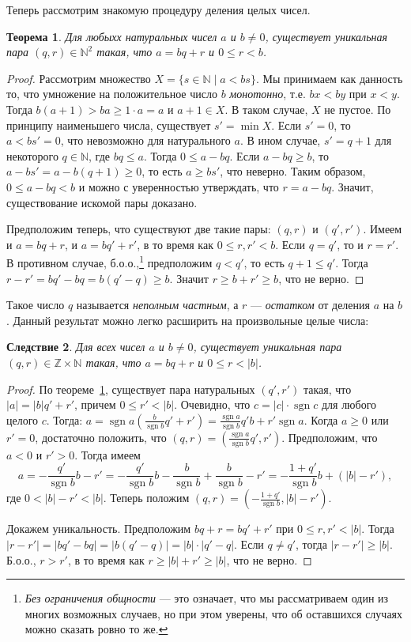 \documentclass[12pt,notitlepage]{article}
\theoremstyle{plain}
\newtheorem{thm}{Теорема}[section]
\newtheorem{corr}[thm]{Следствие}
\theoremstyle{definition}
\theoremstyle{plain}
\newcommand{\N}{\mathbb{N}}
\newcommand{\Z}{\mathbb{Z}}
\newcommand{\1}{\mathbf{1}}
\newcommand{\0}{\mathbf{0}}
\DeclareMathOperator{\sgn}{sgn}
\begin{document}
Теперь рассмотрим знакомую процедуру деления целых чисел.
\begin{thm}\label{L4:t3}
	Для любыхх натуральных чисел $a$ и $b \neq 0$, существует уникальная пара $(q,r) \in \N^2$ такая, что
	$a = b q + r $ и $0 \leq r < b$.
\end{thm}
\begin{proof}
	Рассмотрим множество $X = \{ s \in \N \mid a < b s \}$. Мы принимаем как данность то, что умножение на положительное число $b$ \emph{монотонно}, т.е. $b x < b y$ при $x < y$. Тогда $b (a + 1) > b a \geq  1 \cdot a = a$ и $a + 1 \in X$. В таком случае, $X$ не пустое. По принципу наименьшего числа, существует $s' = \min X$. Если $s' = 0$, то $a < bs' = 0$, что невозможно для натурального $a$. В ином случае, $s' = q + 1$ для некоторого $q \in \N$, где $b q \leq a$. Тогда $0 \leq a - bq$. Если $a - bq \geq b$, то $a - bs' = a - b(q + 1)  \geq 0$, то есть $a \geq bs'$, что неверно. Таким образом, $0 \leq a - bq < b$ и можно с уверенностью утверждать, что $r = a - bq$. Значит, существование искомой пары доказано.
	
	Предположим теперь, что существуют две такие пары: $(q,r)$ и $(q',r')$. Имеем и $a = b q + r$, и $a = b q' + r'$, в то время как $0 \leq r, r' < b$. Если $q = q'$, то и $r = r'$. В противном случае, б.о.о.,\footnote{\emph{Без ограничения общности} --- это означает, что мы рассматриваем один из многих возможных случаев, но при этом уверены, что об оставшихся случаях можно сказать ровно то же.} предположим $q < q'$, то есть $q + 1 \leq q'$. Тогда $r - r' = b q' - b q = b (q' - q) \geq b$. Значит $r \geq b + r' \geq b$, что не верно.
\end{proof}
Такое число $q$ называется \emph{неполным частным}, а $r$ --- \emph{остатком} от деления $a$ на $b$. Данный результат можно легко расширить на произвольные целые числа:
\begin{corr}\label{L4:c4}
	Для всех чисел $a$ и $b \neq 0$, существует уникальная пара $(q,r) \in \Z \times \N$ такая, что
	$a = b q + r $ и $0 \leq r < |b|$.
\end{corr}
\begin{proof}
	По теореме~\ref{L4:t3}, существует пара натуральных $(q',r')$ такая, что $|a| = |b| q' + r'$, причем $0 \leq r' < |b|$. Очевидно, что $c = |c| \cdot \sgn c$ для любого целого $c$. Тогда:
	$a = \sgn a (\frac{b}{\sgn b} q' + r') = \frac{\sgn a}{\sgn b} q' b + r' \sgn a$. Когда $a \geq 0$ или $r' = 0$, достаточно положить, что $(q, r) = (\frac{\sgn a}{\sgn b} q', r')$. Предположим, что $a < 0$ и $r' > 0$. Тогда имеем
	$$a = -\frac{q'}{\sgn b} b - r' = -\frac{q'}{\sgn b} b - \frac{b}{\sgn b} + \frac{b}{\sgn b} - r' = -\frac{1 +q'}{\sgn b} b + (|b| - r'),$$
	где $0 < |b| - r' < |b|$. Теперь положим $(q,r) = (-\frac{1 + q'}{\sgn b} , |b| - r')$.
	
	Докажем уникальность. Предположим $b q + r = b q' + r'$ при $0 \leq r, r' < |b|$. Тогда $|r - r'| = |b q' - b q| = |b (q' - q)| = |b| \cdot |q' - q|$. Если $q \neq q'$, тогда $|r - r'| \geq |b|$. Б.о.о., $r > r'$, в то время как $r \geq |b| + r' \geq |b|$, что не верно.
\end{proof}
\end{document}
